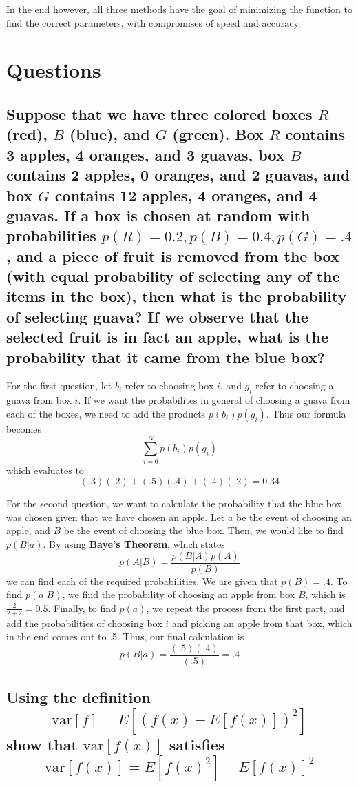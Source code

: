 \documentclass{article}
\begin{document}
				In the end however, all three methods have the goal of minimizing the function to find the 
				correct parameters, with compromises of speed and accuracy.


\section{Questions}


		\subsection{Suppose that we have three colored boxes $R$ (red), $B$ (blue),
				and $G$ (green). Box $R$ contains 3 apples, 4 oranges, and 3 guavas,
				box $B$ contains 2 apples, 0 oranges, and 2 guavas, and box $G$ contains
				12 apples, 4 oranges, and 4 guavas. If a box is chosen at random with 
				probabilities $p(R)=0.2,p(B)=0.4,p(G)=.4$, and a piece of fruit is removed
				from the box (with equal probability of selecting any of the items in the box),
				then what is the probability of selecting guava? If we observe that the selected
				fruit is in fact an apple, what is the probability that it came from the blue box?}

		For the first question, let $b_{i}$ refer to choosing box $i$, and $g_{i}$ refer 
		to choosing a guava from box $i$. If we want the probabilites in general of choosing
		a guava from each of the boxes, we need to add the products $p(b_{i})p(g_{i})$. Thus 
		our formula becomes 
				\[ \sum_{i=0}^{N}p(b_{i})p(g_{i})\]
		which evaluates to 
				\[(.3)(.2) + (.5)(.4) + (.4)(.2) = 0.34\]
		
		For the second question, we want to calculate the probability that the blue box was chosen
		given that we have chosen an apple. Let $a$ be the event of choosing an apple, and $B$ be
		the event of choosing the blue box. Then, we would like to find $p(B|a)$. By using
		\textbf{Baye's Theorem}, which states
		\[ p(A|B) = \frac{p(B|A)p(A)}{p(B)}\]
		we can find each of the required probabilities. We are given that $p(B) = .4$. To find
		$p(a|B)$, we find the probability of choosing an apple from box $B$, which is 
		$\frac{2}{2+2} = 0.5$. Finally, to find $p(a)$, we repeat the process from the first part,
		and add the probabilities of choosing box $i$ and picking an apple from that box, which in the
		end comes out to .5. Thus, our final calculation is 
				\[ p(B|a) = \frac{(.5)(.4)}{(.5)} = .4\]


		\subsection{Using the definition \[\textrm{var}[f] = E[(f(x) - E[f(x)])^{2}] \]
		 show that $\textrm{var}[f(x)]$ satisfies
		\[\textrm{var}[f(x)] = E[f(x)^{2}] - E[f(x)]^{2}\]}
		
\end{document}
